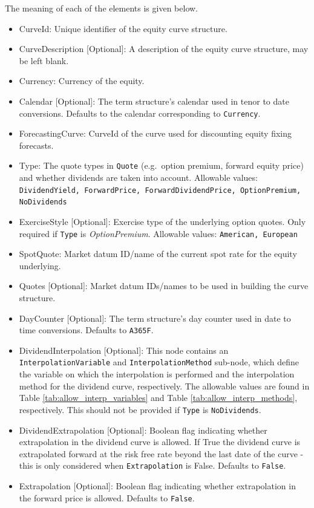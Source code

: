 The meaning of each of the elements is given below.

\begin{itemize}
\item CurveId: Unique identifier of the equity curve structure.
\item CurveDescription [Optional]: A description of the equity curve structure, may be left blank.
\item Currency: Currency of the equity.
\item Calendar [Optional]: The term structure's calendar used in tenor to date conversions. Defaults to the calendar corresponding to \lstinline!Currency!.
\item ForecastingCurve: CurveId of the curve used for discounting equity fixing forecasts.
\item Type: The quote types in \lstinline!Quote! (e.g.\ option premium, forward equity price) and whether dividends are taken into account. Allowable values: {\tt DividendYield, ForwardPrice, ForwardDividendPrice, OptionPremium, NoDividends}
\item ExerciseStyle [Optional]: Exercise type of the underlying option quotes. Only required if \lstinline!Type! is \emph{OptionPremium}. Allowable values: {\tt American, European}
\item SpotQuote: Market datum ID/name of the current spot rate for the equity underlying.
\item Quotes [Optional]: Market datum IDs/names to be used in building the curve structure.
\item DayCounter [Optional]: The term structure's day counter used in date to time conversions. Defaults to {\tt A365F}.
\item DividendInterpolation [Optional]: This node contains an \lstinline!InterpolationVariable! and \lstinline!InterpolationMethod! sub-node, which define the variable on which the interpolation is performed and the interpolation method for the dividend curve, respectively. The allowable values are found in Table \ref{tab:allow_interp_variables} and Table \ref{tab:allow_interp_methods}, respectively. This should not be provided if \lstinline!Type! is {\tt NoDividends}.
\item DividendExtrapolation [Optional]: Boolean flag indicating whether extrapolation in the dividend curve is allowed. If True the dividend curve is extrapolated forward at the risk free rate beyond the last date of the curve - this is only considered when \lstinline!Extrapolation! is False. Defaults to {\tt False}.
\item Extrapolation [Optional]: Boolean flag indicating whether extrapolation in the forward price is allowed. Defaults to {\tt False}.
\end{itemize}

